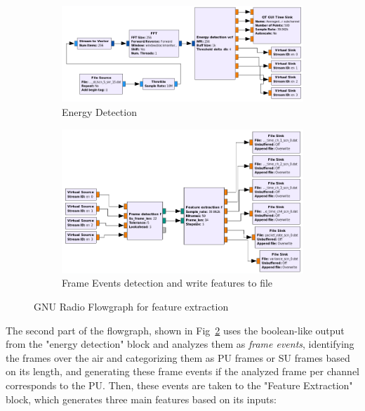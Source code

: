 \begin{figure}[!htb]
    \centering
    \begin{subfigure}[htb]{\textwidth}
        \centering
        \includegraphics[width=\linewidth]{figures/feature_extraction_1}
        \caption{Energy Detection}
        \label{fig:ed}
    \end{subfigure}
    \begin{subfigure}[htb]{\textwidth}
        \centering
        \includegraphics[width=\linewidth]{figures/feature_extraction_2}
        \caption{Frame Events detection and write features to file}
        \label{fig:frame_events}
    \end{subfigure}
    \caption{GNU Radio Flowgraph for feature extraction}
    \label{fig:feature_extraction}
\end{figure}

The second part of the flowgraph, shown in Fig~\ref{fig:frame_events} uses the boolean-like output from the "energy detection" block and analyzes them as \emph{frame events}, identifying the frames over the air and categorizing them as \ac{PU} frames or \ac{SU} frames based on its length, and generating these frame events if the analyzed frame per channel corresponds to the \ac{PU}.  Then, these events are taken to the "Feature Extraction" block, which generates three main features based on its inputs:


